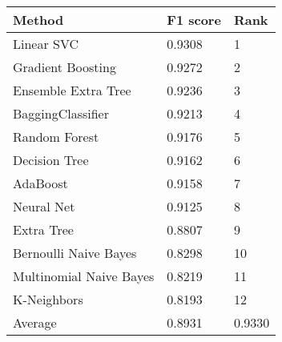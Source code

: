 \begin{tabular}{|l|l|l| }
\hline
Method                  & F1 score & Rank \\ \hline
Linear SVC              & 0.9308 & 1\\
Gradient Boosting       & 0.9272 & 2\\
Ensemble Extra Tree     & 0.9236 & 3\\
BaggingClassifier       & 0.9213 & 4\\
Random Forest           & 0.9176 & 5\\
Decision Tree           & 0.9162 & 6\\
AdaBoost                & 0.9158 & 7\\
Neural Net              & 0.9125 & 8\\
Extra Tree              & 0.8807 & 9\\
Bernoulli Naive Bayes   & 0.8298 & 10\\
Multinomial Naive Bayes & 0.8219 & 11\\
K-Neighbors             & 0.8193 & 12\\
Average & 0.8931 & 0.9330 & \\
\hline
\end{tabular}